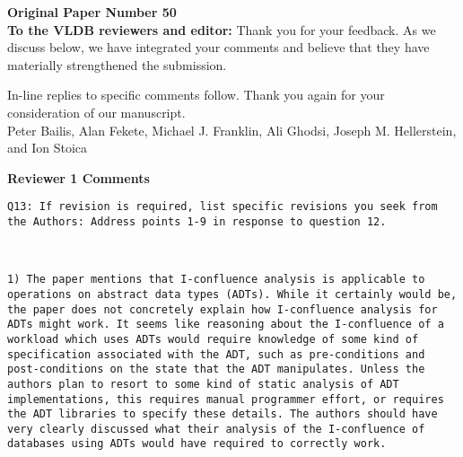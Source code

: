 \documentclass[10pt]{article}
\newcommand{\reviewer}[1] {\noindent\colorbox{reviewercolor}{\parbox{\textwidth}{\noindent\texttt{#1}}}\\}
\newcommand{\reviewerstart}[1]{\noindent\textbf{\large{#1}}}
\begin{document}
\noindent\textbf{{\large Original Paper Number 50}}\\

\noindent\textbf{To the VLDB reviewers and editor:} Thank you
for your feedback. As we discuss below, we have integrated your
comments and believe that they have materially strengthened the
submission. 

\noindent In-line replies to specific comments follow. Thank you again for
your consideration of our manuscript.\\

\noindent Peter Bailis, Alan Fekete, Michael J. Franklin, Ali Ghodsi,
Joseph M. Hellerstein, and Ion Stoica\\

\hrulefill

\label{intro}

\begin{comment}
\vspace{2em}

\begin{tabular}{l r}
\underline{\textbf{Contents}} & \underline{\textbf{Page}}\\
{Introduction} & \hspace{5em}\pageref{intro}\\
{Reviewer 1 Comments} & \pageref{r1c}\\
{Reviewer 2 Comments} & \pageref{r2c}\\
{Reviewer 3 Comments} & \pageref{r3c}\\
\end{tabular}
\end{comment}

\newpage
\reviewerstart{Reviewer 1 Comments}\\
\label{r1c}

\reviewer{Q13: If revision is required, list specific revisions you
  seek from the Authors: Address points 1-9 in response to question 12.}

\reviewer{1) The paper mentions that I-confluence analysis is
  applicable to operations on abstract data types (ADTs). While it
  certainly would be, the paper does not concretely explain how
  I-confluence analysis for ADTs might work. It seems like reasoning
  about the I-confluence of a workload which uses ADTs would require
  knowledge of some kind of specification associated with the ADT,
  such as pre-conditions and post-conditions on the state that the ADT
  manipulates. Unless the authors plan to resort to some kind of
  static analysis of ADT implementations, this requires manual
  programmer effort, or requires the ADT libraries to specify these
  details. The authors should have very clearly discussed what their
  analysis of the I-confluence of databases using ADTs would have
  required to correctly work.}
\end{document}
